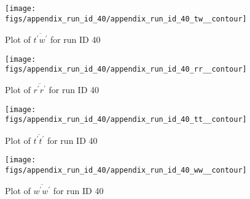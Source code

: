 \begin{figure}[H]
\centering
\texttt{[image: figs/appendix\_run\_id\_40/appendix\_run\_id\_40\_tw\_\_contour]}
\caption{Plot of $\overline{t^\prime w^\prime}$ for run ID 40}
\label{fig:appendix_run_id_40_tw__contour}
\end{figure}


\begin{figure}[H]
\centering
\texttt{[image: figs/appendix\_run\_id\_40/appendix\_run\_id\_40\_rr\_\_contour]}
\caption{Plot of $\overline{r^\prime r^\prime}$ for run ID 40}
\label{fig:appendix_run_id_40_rr__contour}
\end{figure}


\begin{figure}[H]
\centering
\texttt{[image: figs/appendix\_run\_id\_40/appendix\_run\_id\_40\_tt\_\_contour]}
\caption{Plot of $\overline{t^\prime t^\prime}$ for run ID 40}
\label{fig:appendix_run_id_40_tt__contour}
\end{figure}


\begin{figure}[H]
\centering
\texttt{[image: figs/appendix\_run\_id\_40/appendix\_run\_id\_40\_ww\_\_contour]}
\caption{Plot of $\overline{w^\prime w^\prime}$ for run ID 40}
\label{fig:appendix_run_id_40_ww__contour}
\end{figure}


